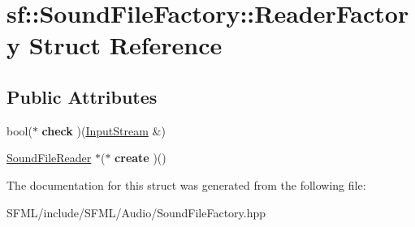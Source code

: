 \hypertarget{structsf_1_1_sound_file_factory_1_1_reader_factory}{}\section{sf\+:\+:Sound\+File\+Factory\+:\+:Reader\+Factory Struct Reference}
\label{structsf_1_1_sound_file_factory_1_1_reader_factory}
\subsection*{Public Attributes}
\begin{DoxyCompactItemize}
\item 
\mbox{\label{structsf_1_1_sound_file_factory_1_1_reader_factory_afbbfef9680e3bb0532408927957c732a}} 
bool($\ast$ {\bfseries check} )(\mbox{\hyperlink{classsf_1_1_input_stream}{Input\+Stream}} \&)
\item 
\mbox{\label{structsf_1_1_sound_file_factory_1_1_reader_factory_ab98cb6a65d29fc102d6b8fffba6e96fd}} 
\mbox{\hyperlink{classsf_1_1_sound_file_reader}{Sound\+File\+Reader}} $\ast$($\ast$ {\bfseries create} )()
\end{DoxyCompactItemize}


The documentation for this struct was generated from the following file\+:\begin{DoxyCompactItemize}
\item 
S\+F\+M\+L/include/\+S\+F\+M\+L/\+Audio/Sound\+File\+Factory.\+hpp\end{DoxyCompactItemize}
